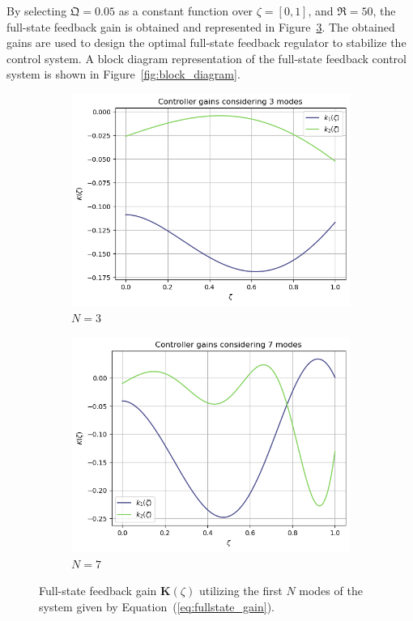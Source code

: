 By selecting $\mathfrak{Q} = 0.05$ as a constant function over $\zeta = [0,1]$, and $\mathfrak{R} = 50$, the full-state feedback gain is obtained and represented in Figure~\ref{fig:k_modes}. The obtained gains are used to design the optimal full-state feedback regulator to stabilize the control system. A block diagram representation of the full-state feedback control system is shown in Figure~\ref{fig:block_diagram}.

\begin{figure}[!htbp]
    \centering
    \begin{subfigure}[b]{0.45\textwidth}
        \centering
        \includegraphics[width=\textwidth]{Figures/k_3.png}
        \caption{$N = 3$}
        \label{fig:k_3}
    \end{subfigure}
    \hfill
    \begin{subfigure}[b]{0.45\textwidth}
        \centering
        \includegraphics[width=\textwidth]{Figures/k_7.png}
        \caption{$N = 7$}
        \label{fig:k_7}
    \end{subfigure}
    \caption{Full-state feedback gain $\bm{K}(\zeta)$ utilizing the first $N$ modes of the system given by Equation~(\ref{eq:fullstate_gain}).}
    \label{fig:k_modes}
\end{figure}

